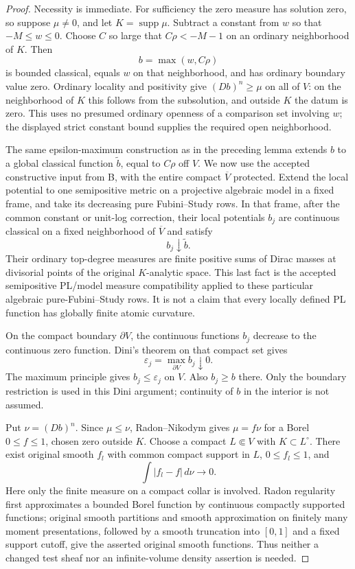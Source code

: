 \documentclass[11pt,a4paper]{article}
\numberwithin{equation}{section}
\theoremstyle{definition}
\theoremstyle{remark}
\begin{document}
\begin{proof}
Necessity is immediate.  For sufficiency the zero measure has
solution zero, so suppose $\mu\ne0$, and let $K=\operatorname{supp}\mu$.
Subtract a constant from $w$ so that $-M\leq w\leq0$.  Choose
$C$ so large that $C\rho<-M-1$ on an ordinary neighborhood of $K$.
Then
\[
 b=\max(w,C\rho)
\]
is bounded classical, equals $w$ on that neighborhood, and has
ordinary boundary value zero.  Ordinary locality and positivity
give $(Db)^n\geq\mu$ on all of $V$: on the neighborhood of $K$
this follows from the subsolution, and outside $K$ the datum is
zero.  This uses no presumed ordinary openness of a comparison
set involving $w$; the displayed strict constant bound supplies
the required open neighborhood.

The same epsilon-maximum construction as in the preceding lemma
extends $b$ to a global classical function $\widetilde b$, equal
to $C\rho$ off $V$.  We now use the accepted constructive input
from B, with the entire compact $\overline V$ protected.  Extend
the local potential to one semipositive metric on a projective
algebraic model in a fixed frame, and take its decreasing pure
Fubini--Study rows.  In that frame, after the common constant or
unit-log correction, their local potentials $b_j$ are continuous
classical on a fixed neighborhood of $\overline V$ and satisfy
\[
 b_j\downarrow\widetilde b.
\]
Their ordinary top-degree measures are finite positive sums of
Dirac masses at divisorial points of the original $K$-analytic
space.  This last fact is the accepted semipositive PL/model
measure compatibility applied to these particular algebraic
pure-Fubini--Study rows.  It is not a claim that every locally
defined PL function has globally finite atomic curvature.

On the compact boundary $\partial V$, the continuous functions
$b_j$ decrease to the continuous zero function.  Dini's theorem
on that compact set gives
\[
 \varepsilon_j=\max_{\partial V}b_j\downarrow0.
\]
The maximum principle gives $b_j\leq\varepsilon_j$ on $V$.
Also $b_j\geq b$ there.  Only the boundary restriction is used in
this Dini argument; continuity of $b$ in the interior is not assumed.

Put $\nu=(Db)^n$.  Since $\mu\leq\nu$, Radon--Nikodym gives
$\mu=f\nu$ for a Borel $0\leq f\leq1$, chosen zero outside $K$.
Choose a compact $L\Subset V$ with $K\subset L^{\circ}$.
There exist original smooth $f_l$ with common compact support in
$L$, $0\leq f_l\leq1$, and
\[
 \int|f_l-f|\,d\nu\longrightarrow0.
\]
Here only the finite measure on a compact collar is involved.
Radon regularity first approximates a bounded Borel function by
continuous compactly supported functions; original smooth
partitions and smooth approximation on finitely many moment
presentations, followed by a smooth truncation into $[0,1]$ and
a fixed support cutoff, give the asserted original smooth functions.
Thus neither a changed test sheaf nor an infinite-volume density
assertion is needed.


\end{proof}
\end{document}
